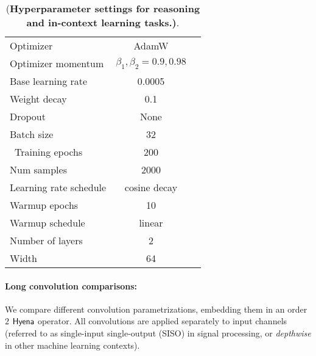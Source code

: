 \begin{table}[ht]
      \small
      \caption{{(\bf Hyperparameter settings for reasoning and in-context learning tasks.)}.
      }
        \centering
        \begin{tabular}{lcc}
            \toprule
            Optimizer & AdamW \\
            Optimizer momentum & $\beta_1,\beta_2=0.9,0.98$ \\
            Base learning rate & 0.0005 \\
            Weight decay & 0.1 \\
            Dropout & None \\
            Batch size & 32 \\\
            Training epochs & 200 \\
            Num samples & 2000 \\ 
            Learning rate schedule & cosine decay \\
            Warmup epochs & 10 \\
            Warmup schedule & linear \\
            Number of layers & 2 \\ 
            Width & 64 \\
            \bottomrule
        \end{tabular}
        \label{tab:synthetics}
\end{table}

\paragraph{Long convolution comparisons:}
%
We compare different convolution parametrizations, embedding them in an order $2$ ${\sf Hyena}$ operator. All convolutions are applied separately to input channels (referred to as single-input single-output (SISO) in signal processing, or \textit{depthwise} in other machine learning contexts).

